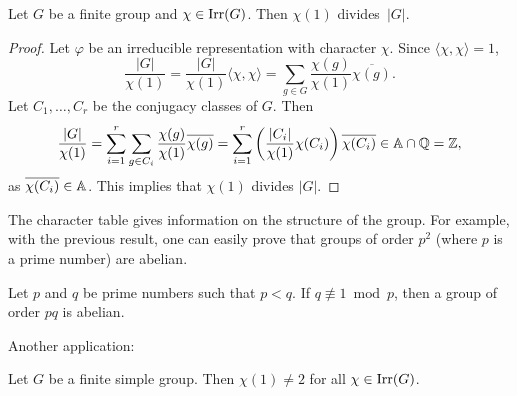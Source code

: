 \label{degree}

\begin{theorem}[Frobenius]
\label{thm:Frobenius_chi(1)}
    Let $G$ be a finite group and $\chi\in\operatorname{Irr}(G)$. 
    Then $\chi(1)$ divides~$|G|$. 
\end{theorem}

\begin{proof}
    Let $\varphi$ be an irreducible representation with character $\chi$. 
    Since $\langle\chi,\chi\rangle=1$, 
    \[
    \frac{|G|}{\chi(1)}=\frac{|G|}{\chi(1)}\langle\chi,\chi\rangle
    =\sum_{g\in G}\frac{\chi(g)}{\chi(1)}\overline{\chi(g)}.
    \]
    Let $C_1,\dots,C_r$ be the conjugacy classes of $G$. 
    Then 
    \[
        \frac{|G|}{\chi(1)}
        =\sum_{i=1}^r\sum_{g\in C_i}\frac{\chi(g)}{\chi(1)}\overline{\chi(g)}
        =\sum_{i=1}^r\left(\frac{|C_i|}{\chi(1)}\chi(C_i)\right)\overline{\chi(C_i)}\in\mathbb{A}\cap\mathbb{Q}=\mathbb{Z},
    \]
    as $\overline{\chi(C_i)}\in\mathbb{A}$. This implies that $\chi(1)$ divides $|G|$. 
\end{proof}

The character table gives information on the structure of the group. For example,
with the previous result, one can easily prove that
groups of order $p^2$ (where $p$ is a prime number) are abelian. 

\begin{exercise}
    Let $p$ and $q$ be prime numbers such that $p<q$.
    If $q\not\equiv1\bmod p$, then a group of order $pq$ is abelian. 
\end{exercise}

Another application:

\begin{theorem}
    Let $G$ be a finite simple group. 
    Then $\chi(1)\ne2$ for all $\chi\in\operatorname{Irr}(G)$. 
\end{theorem}

